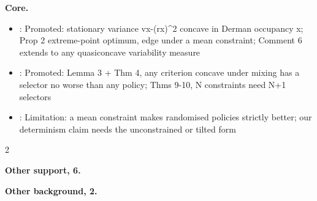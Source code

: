 \documentclass[10pt]{article}
\newcommand{\memb}[1]{\par\smallskip\textbf{#1}\quad}
\begin{document}
\memb{Core.}
\begin{itemize}[nosep,leftmargin=1.2em]
\item \citet{Sobel-meanvariance94}: Promoted: stationary variance vx-(rx)\^{}2 concave in Derman occupancy x; Prop 2 extreme-point optimum, edge under a mean constraint; Comment 6 extends to any quasiconcave variability measure
\item \citet{Piunovskiy-controlled98}: Promoted: Lemma 3 + Thm 4, any criterion concave under mixing has a selector no worse than any policy; Thms 9-10, N constraints need N+1 selectors
\item \citet{Mannor-algorithmic13}: Limitation: a mean constraint makes randomised policies strictly better; our determinism claim needs the unconstrained or tilted form
\end{itemize}
\begin{multicols}{2}
\memb{Other support, 6.} \citetext{\citealp{Feinberg-nonrandomized82}\dag; \citealp{Kurano-markov87}\dag; \citealp{Filar-variance89}; \citealp{Altman-markov91}; \citealp{Haskell-stochastic13}; \citealp{Xia-risksensitive20}}

\memb{Other background, 2.} {\footnotesize \citetext{\citealp{Piunovskiy-optimal97}; \citealp{Haskell-convex15}}}

\end{multicols}
\end{document}

